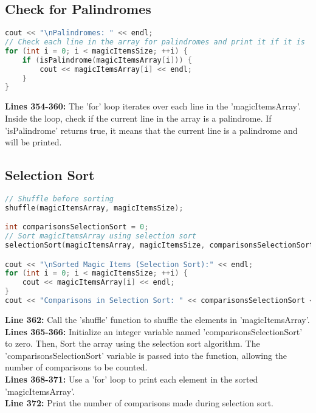\documentclass[letterpaper, 10pt,DIV=13]{scrartcl}
\numberwithin{equation}{section} %
\numberwithin{figure}{section} %
\numberwithin{table}{section} %
\begin{document}
\subsection{Check for Palindromes}
\begin{linenumbers}
\begin{lstlisting}[language=C++, caption={Check for Palindromes}, label={code:example}]
cout << "\nPalindromes: " << endl;
// Check each line in the array for palindromes and print it if it is
for (int i = 0; i < magicItemsSize; ++i) {
    if (isPalindrome(magicItemsArray[i])) {
        cout << magicItemsArray[i] << endl;
    }
}
\end{lstlisting}
\end{linenumbers}
\nolinenumbers

\textbf{Lines 354-360:} The 'for' loop iterates over each line in the 'magicItemsArray'. Inside the loop, check if the current line in the array is a palindrome. If 'isPalindrome' returns true, it means that the current line is a palindrome and will be printed.

\subsection{Selection Sort}
\begin{linenumbers}
\begin{lstlisting}[language=C++, caption={Selection Sort}, label={code:example}]
// Shuffle before sorting
shuffle(magicItemsArray, magicItemsSize);

int comparisonsSelectionSort = 0;
// Sort magicItemsArray using selection sort
selectionSort(magicItemsArray, magicItemsSize, comparisonsSelectionSort);

cout << "\nSorted Magic Items (Selection Sort):" << endl;
for (int i = 0; i < magicItemsSize; ++i) {
    cout << magicItemsArray[i] << endl;
}
cout << "Comparisons in Selection Sort: " << comparisonsSelectionSort << endl;
\end{lstlisting}
\end{linenumbers}
\nolinenumbers

\textbf{Line 362:} Call the 'shuffle' function to shuffle the elements in 'magicItemsArray'. \\
\textbf{Lines 365-366:} Initialize an integer variable named 'comparisonsSelectionSort' to zero. Then, Sort the array using the selection sort algorithm. The 'comparisonsSelectionSort' variable is passed into the function, allowing the number of comparisons to be counted. \\
\textbf{Lines 368-371:} Use a 'for' loop to print each element in the sorted 'magicItemsArray'. \\
\textbf{Line 372:} Print the number of comparisons made during selection sort.
\end{document}
